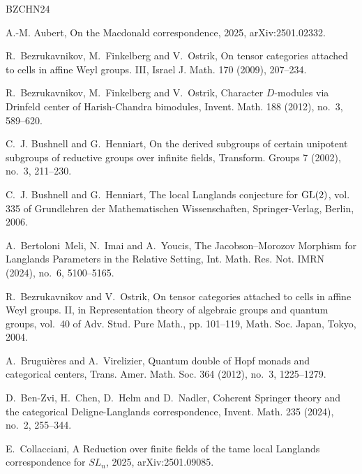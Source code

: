 \documentclass[12pt,a4paper]{article}
\begin{document}
\begin{thebibliography}{BZCHN24}
	\providecommand{\url}[1]{\texttt{#1}}
	\providecommand{\urlprefix}{URL }
	\providecommand{\eprint}[2][]{\url{#2}}
	
	A.-M. Aubert, On the Macdonald correspondence, 2025, arXiv:2501.02332.
	
	R.~Bezrukavnikov, M.~Finkelberg and V.~Ostrik, On tensor categories attached to
	cells in affine {W}eyl groups. {III}, Israel J. Math. 170 (2009), 207--234.
	
	R.~Bezrukavnikov, M.~Finkelberg and V.~Ostrik, Character {$D$}-modules via
	{D}rinfeld center of {H}arish-{C}handra bimodules, Invent. Math. 188 (2012),
	no.~3, 589--620.
	
	C.~J. Bushnell and G.~Henniart, On the derived subgroups of certain unipotent
	subgroups of reductive groups over infinite fields, Transform. Groups 7
	(2002), no.~3, 211--230.
	
	C.~J. Bushnell and G.~Henniart, The local {L}anglands conjecture for {$\rm
		GL(2)$}, vol. 335 of Grundlehren der Mathematischen Wissenschaften,
	Springer-Verlag, Berlin, 2006.
	
	A.~Bertoloni~Meli, N.~Imai and A.~Youcis, The {J}acobson--{M}orozov {M}orphism
	for {L}anglands {P}arameters in the {R}elative {S}etting, Int. Math. Res.
	Not. IMRN  (2024), no.~6, 5100--5165.
	
	R.~Bezrukavnikov and V.~Ostrik, On tensor categories attached to cells in
	affine {W}eyl groups. {II}, in Representation theory of algebraic groups and
	quantum groups, vol.~40 of Adv. Stud. Pure Math., pp. 101--119, Math. Soc.
	Japan, Tokyo, 2004.
	
	A.~Brugui\`eres and A.~Virelizier, Quantum double of {H}opf monads and
	categorical centers, Trans. Amer. Math. Soc. 364 (2012), no.~3, 1225--1279.
	
	D.~Ben-Zvi, H.~Chen, D.~Helm and D.~Nadler, Coherent {S}pringer theory and the
	categorical {D}eligne-{L}anglands correspondence, Invent. Math. 235 (2024),
	no.~2, 255--344.
	
	E.~Collacciani, A Reduction over finite fields of the tame local Langlands
	correspondence for $\mathit{SL}_n$, 2025, arXiv:2501.09085.
	

\end{thebibliography}
\end{document}
